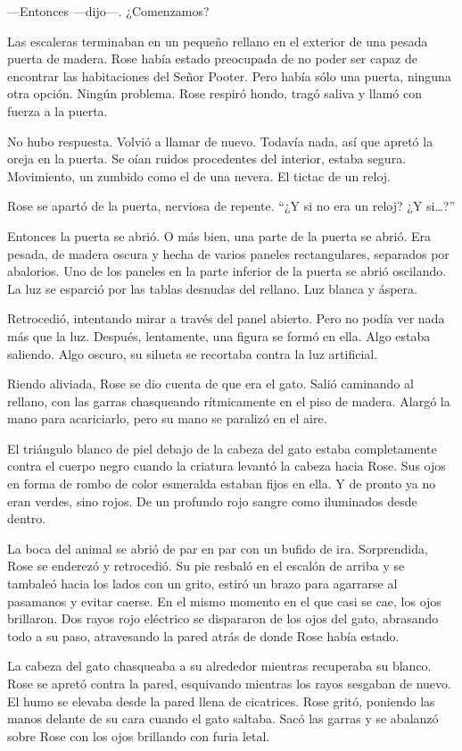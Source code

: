 {---Entonces ---dijo---. ¿Comenzamos?}

{Las escaleras terminaban en un pequeño rellano en el exterior de una
	pesada puerta de madera. Rose había estado preocupada de no poder ser
	capaz de encontrar las habitaciones del Señor Pooter. Pero había sólo
	una puerta, ninguna otra opción. Ningún problema. Rose respiró hondo,
tragó saliva y llamó con fuerza a la puerta.}

{No hubo respuesta. Volvió a llamar de nuevo. Todavía nada, así que
	apretó la oreja en la puerta. Se oían ruidos procedentes del interior,
	estaba segura. Movimiento, un zumbido como el de una nevera. El tictac
de un reloj.}

{Rose se apartó de la puerta, nerviosa de repente. ``¿Y si no era un
	reloj? ¿Y si\ldots{}?''}

{Entonces la puerta se abrió. O más bien, una parte de la puerta se
	abrió. Era pesada, de madera oscura y hecha de varios paneles
	rectangulares, separados por abalorios. Uno de los paneles en la parte
	inferior de la puerta se abrió oscilando. La luz se esparció por las
tablas desnudas del rellano. Luz blanca y áspera.}

{Retrocedió, intentando mirar a través del panel abierto. Pero no podía
	ver nada más que la luz. Después, lentamente, una figura se formó en
	ella. Algo estaba saliendo. Algo oscuro, su silueta se recortaba contra
la luz artificial.}

{Riendo aliviada, Rose se dio cuenta de que era el gato. Salió caminando
	al rellano, con las garras chasqueando rítmicamente en el piso de
	madera. Alargó la mano para acariciarlo, pero su mano se paralizó en el
aire.}

{El triángulo blanco de piel debajo de la cabeza del gato estaba
	completamente contra el cuerpo negro cuando la criatura levantó la
	cabeza hacia Rose. Sus ojos en forma de rombo de color esmeralda estaban
	fijos en ella. Y de pronto ya no eran verdes, sino rojos. De un profundo
rojo sangre como iluminados desde dentro.}

{La boca del animal se abrió de par en par con un bufido de ira.
	Sorprendida, Rose se enderezó y retrocedió. Su pie resbaló en el escalón
	de arriba y se tambaleó hacia los lados con un grito, estiró un brazo
	para agarrarse al pasamanos y evitar caerse. En el mismo momento en el
	que casi se cae, los ojos brillaron. Dos rayos rojo eléctrico se
	dispararon de los ojos del gato, abrasando todo a su paso, atravesando
la pared atrás de donde Rose había estado.}

{La cabeza del gato chasqueaba a su alrededor mientras recuperaba su
	blanco. Rose se apretó contra la pared, esquivando mientras los rayos
	sesgaban de nuevo. El humo se elevaba desde la pared llena de
	cicatrices. Rose gritó, poniendo las manos delante de su cara cuando el
	gato saltaba. Sacó las garras y se abalanzó sobre Rose con los ojos
brillando con furia letal.}
